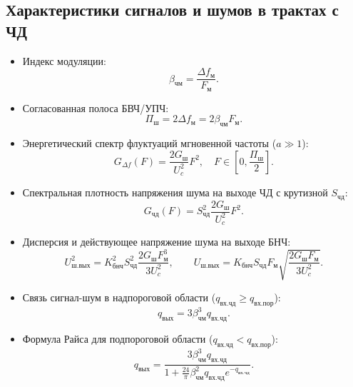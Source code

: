 \documentclass[12pt,a4paper]{article}
\begin{document}
\subsection{Характеристики сигналов и шумов в трактах с ЧД}
\begin{itemize}
    \item Индекс модуляции:
    \begin{equation}
    \beta_{\text{чм}} = \frac{\Delta f_{\text{м}}}{F_{\text{м}}}.
    \end{equation}
    \item Согласованная полоса БВЧ/УПЧ:
    \begin{equation}
    \Pi_{\text{ш}} = 2 \Delta f_{\text{м}} = 2 \beta_{\text{чм}} F_{\text{м}}.
    \end{equation}
    \item Энергетический спектр флуктуаций мгновенной частоты ($a \gg 1$):
    \begin{equation}
    G_{\Delta f}(F) = \frac{2 G_{\text{ш}}}{U_c^2} F^2, \quad F \in \left[0, \frac{\Pi_{\text{ш}}}{2}\right].
    \end{equation}
    \item Спектральная плотность напряжения шума на выходе ЧД с крутизной $S_{\text{чд}}$:
    \begin{equation}
    G_{\text{чд}}(F) = S_{\text{чд}}^2 \frac{2 G_{\text{ш}}}{U_c^2} F^2.
    \end{equation}
    \item Дисперсия и действующее напряжение шума на выходе БНЧ:
    \begin{equation}
    U_{\text{ш.вых}}^2 = K_{\text{бнч}}^2 S_{\text{чд}}^2 \frac{2 G_{\text{ш}} F_{\text{м}}^3}{3 U_c^2}, \qquad U_{\text{ш.вых}} = K_{\text{бнч}} S_{\text{чд}} F_{\text{м}} \sqrt{\frac{2 G_{\text{ш}} F_{\text{м}}}{3 U_c^2}}.
    \end{equation}
    \item Связь сигнал-шум в надпороговой области ($q_{\text{вх.чд}} \ge q_{\text{вх.пор}}$):
    \begin{equation}
    q_{\text{вых}} = 3 \beta_{\text{чм}}^3 q_{\text{вх.чд}}.
    \end{equation}
    \item Формула Райса для подпороговой области ($q_{\text{вх.чд}} < q_{\text{вх.пор}}$):
    \begin{equation}
    q_{\text{вых}} = \frac{3 \beta_{\text{чм}}^3 q_{\text{вх.чд}}}{1 + \frac{24}{\pi} \beta_{\text{чм}}^2 q_{\text{вх.чд}} e^{-q_{\text{вх.чд}}}}.
    \end{equation}
\end{itemize}
\end{document}
